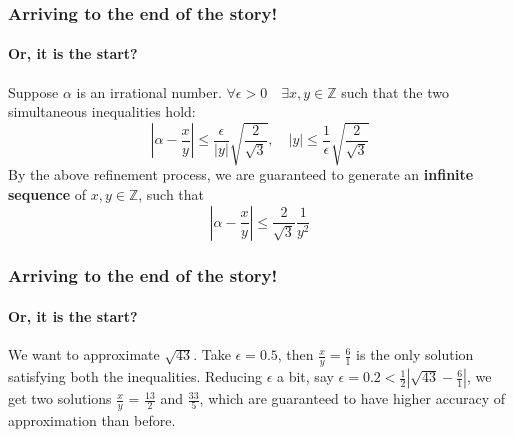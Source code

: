 \documentclass{beamer}
\begin{document}
    \begin{frame}
        \frametitle{Arriving to the end of the story!}
        \framesubtitle{Or, it is the start?}
        \begin{theorem} 
            Suppose \(\alpha\) is an irrational number. \(\forall \epsilon > 0 \quad \exists x, y \in \mathbb{Z}\) such that the two simultaneous inequalities hold: \[\left|\alpha - \frac{x}{y}\right| \leq \frac{\epsilon}{|y|}\sqrt{\frac{2}{\sqrt{3}}}, \quad |y| \leq \frac{1}{\epsilon}\sqrt{\frac{2}{\sqrt{3}}}\] 
            By the above refinement process, we are guaranteed to generate an \textbf{infinite sequence} of \(x,y \in \mathbb{Z}\), such that \[\left|\alpha - \frac{x}{y}\right| \leq \frac{2}{\sqrt{3}} \frac{1}{y^2}\]
        \end{theorem}
        

    \end{frame}
    \begin{frame}
        \frametitle{Arriving to the end of the story!}
        \framesubtitle{Or, it is the start?}
        \begin{example}
            We want to approximate \(\sqrt{43}\). Take \(\epsilon = 0.5\), then \(\frac{x}{y} = \frac{6}{1}\) is the only solution satisfying both the inequalities. Reducing \(\epsilon\) a bit, say \(\epsilon = 0.2 < \frac{1}{2}\left|\sqrt{43} - \frac{6}{1}\right|\), we get two solutions \(\frac{x}{y}\) = \(\frac{13}{2}\) and \(\frac{33}{5}\), which are guaranteed to have higher accuracy of approximation than before.
        \end{example}
    \end{frame}
    
\end{document}
